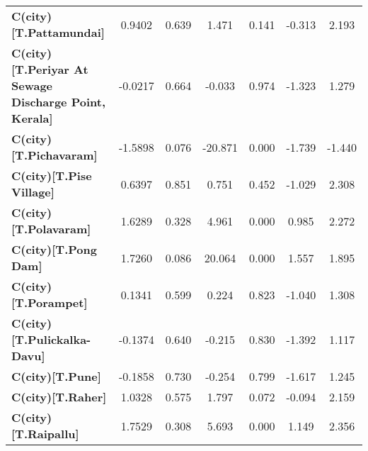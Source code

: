 \begin{center}
\begin{tabular}{lcccccc}
\textbf{C(city)[T.Pattamundai]}                                                                     &       0.9402  &        0.639     &     1.471  &         0.141        &       -0.313    &        2.193     \\
\textbf{C(city)[T.Periyar At Sewage Discharge Point, Kerala]}                                       &      -0.0217  &        0.664     &    -0.033  &         0.974        &       -1.323    &        1.279     \\
\textbf{C(city)[T.Pichavaram]}                                                                      &      -1.5898  &        0.076     &   -20.871  &         0.000        &       -1.739    &       -1.440     \\
\textbf{C(city)[T.Pise Village]}                                                                    &       0.6397  &        0.851     &     0.751  &         0.452        &       -1.029    &        2.308     \\
\textbf{C(city)[T.Polavaram]}                                                                       &       1.6289  &        0.328     &     4.961  &         0.000        &        0.985    &        2.272     \\
\textbf{C(city)[T.Pong Dam]}                                                                        &       1.7260  &        0.086     &    20.064  &         0.000        &        1.557    &        1.895     \\
\textbf{C(city)[T.Porampet]}                                                                        &       0.1341  &        0.599     &     0.224  &         0.823        &       -1.040    &        1.308     \\
\textbf{C(city)[T.Pulickalka-Davu]}                                                                 &      -0.1374  &        0.640     &    -0.215  &         0.830        &       -1.392    &        1.117     \\
\textbf{C(city)[T.Pune]}                                                                            &      -0.1858  &        0.730     &    -0.254  &         0.799        &       -1.617    &        1.245     \\
\textbf{C(city)[T.Raher]}                                                                           &       1.0328  &        0.575     &     1.797  &         0.072        &       -0.094    &        2.159     \\
\textbf{C(city)[T.Raipallu]}                                                                        &       1.7529  &        0.308     &     5.693  &         0.000        &        1.149    &        2.356     \\

\end{tabular}
\end{center}
